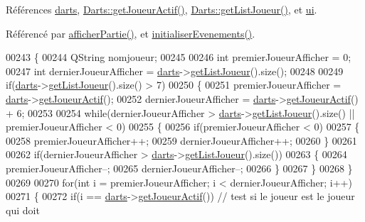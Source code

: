 Références \hyperlink{ihm_8h_source_l00055}{darts}, \hyperlink{darts_8cpp_source_l00077}{Darts\+::get\+Joueur\+Actif()}, \hyperlink{darts_8cpp_source_l00055}{Darts\+::get\+List\+Joueur()}, et \hyperlink{ihm_8h_source_l00052}{ui}.



Référencé par \hyperlink{ihm_8cpp_source_l00333}{afficher\+Partie()}, et \hyperlink{ihm_8cpp_source_l00075}{initialiser\+Evenements()}.


\begin{DoxyCode}
00243 \{
00244     QString nomjoueur;
00245 
00246     \textcolor{keywordtype}{int} premierJoueurAfficher = 0;
00247     \textcolor{keywordtype}{int} dernierJoueurAfficher = \hyperlink{class_ihm_a2a0f54d33f4d6b2531ec2190c4a2356e}{darts}->\hyperlink{class_darts_a0525b09703d3461bf5570197354743c3}{getListJoueur}().size();
00248 
00249     \textcolor{keywordflow}{if}(\hyperlink{class_ihm_a2a0f54d33f4d6b2531ec2190c4a2356e}{darts}->\hyperlink{class_darts_a0525b09703d3461bf5570197354743c3}{getListJoueur}().size() > 7)
00250     \{
00251         premierJoueurAfficher = \hyperlink{class_ihm_a2a0f54d33f4d6b2531ec2190c4a2356e}{darts}->\hyperlink{class_darts_a20ddfd28c8355c06a90cc23abff3de11}{getJoueurActif}();
00252         dernierJoueurAfficher = \hyperlink{class_ihm_a2a0f54d33f4d6b2531ec2190c4a2356e}{darts}->\hyperlink{class_darts_a20ddfd28c8355c06a90cc23abff3de11}{getJoueurActif}() + 6;
00253 
00254         \textcolor{keywordflow}{while}(dernierJoueurAfficher > \hyperlink{class_ihm_a2a0f54d33f4d6b2531ec2190c4a2356e}{darts}->\hyperlink{class_darts_a0525b09703d3461bf5570197354743c3}{getListJoueur}().size() || 
      premierJoueurAfficher < 0)
00255         \{
00256             \textcolor{keywordflow}{if}(premierJoueurAfficher < 0)
00257             \{
00258                 premierJoueurAfficher++;
00259                 dernierJoueurAfficher++;
00260             \}
00261 
00262             \textcolor{keywordflow}{if}(dernierJoueurAfficher > \hyperlink{class_ihm_a2a0f54d33f4d6b2531ec2190c4a2356e}{darts}->\hyperlink{class_darts_a0525b09703d3461bf5570197354743c3}{getListJoueur}().size())
00263             \{
00264                 premierJoueurAfficher--;
00265                 dernierJoueurAfficher--;
00266             \}
00267         \}
00268     \}
00269 
00270     \textcolor{keywordflow}{for}(\textcolor{keywordtype}{int} i = premierJoueurAfficher; i < dernierJoueurAfficher; i++)
00271     \{
00272         \textcolor{keywordflow}{if}(i == \hyperlink{class_ihm_a2a0f54d33f4d6b2531ec2190c4a2356e}{darts}->\hyperlink{class_darts_a20ddfd28c8355c06a90cc23abff3de11}{getJoueurActif}())    \textcolor{comment}{// test si le joueur est le joueur qui doit
}
\end{DoxyCode}
